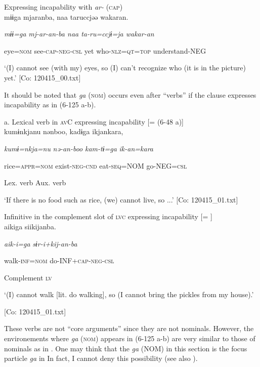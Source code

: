\ea\label{ex:6-124}
 Expressing incapability with \textit{ar-} (\textsc{cap})\\

{\TM}
\gll mɨɨga  mjaranba,  naa  taruccjəə  wakaran.

    \textit{mɨɨ=ga}  \textit{mj-ar-an{}-ba  naa  ta-ru=ccjɨ=ja  wakar-an}

    eye=\textsc{nom}  see-\textsc{cap}-\textsc{neg}-\textsc{csl}  yet  who-\textsc{nlz}=\textsc{qt}=\textsc{top}  understand-NEG

\glt    ‘(I) cannot see (with my) eyes, so (I) can’t recognize who (it is in the picture) yet.’ [Co: 120415\_00.txt]
\z

It should be noted that \textit{ga} (\textsc{nom}) occurs even after “verbs” if the clause expresses incapability as in (6-125 a-b).

\ea\label{ex:6-125}
 a. Lexical verb in \textsc{av}C expressing incapability [= (6-48 a)]\\

{\TM}
\gll kumɨnkjanu  nənboo,  kadɨga  ikjankara,

    \textit{kumɨ=nkja=nu}  \textit{nə-an-boo}  \textit{kam-tɨ=ga}  \textit{ik-an=kara}

    rice=\textsc{appr}=\textsc{nom}  exist-\textsc{neg}-\textsc{cnd}  eat-\textsc{seq}=NOM  go-NEG=\textsc{csl}

        Lex. verb  Aux. verb

\glt    ‘If there is no food such as rice, (we) cannot live, so ...’ [Co: 120415\_01.txt]
\z

\ex Infinitive in the complement slot of \textsc{lvc} expressing incapability [= ]\\

{\TM}
\gll aikiga  siikijanba.

    \textit{aik-i=ga}  \textit{sɨr-i+kij-an{}-ba}

    walk-\textsc{inf}=\textsc{nom}  do-INF+\textsc{cap}-\textsc{neg}-\textsc{csl}

    Complement  \textsc{lv}

\glt    ‘(I) cannot walk [lit. do walking], so (I cannot bring the pickles from my house).’

  [Co: 120415\_01.txt]
\z

These verbs are not “core arguments” since they are not nominals. However, the environements where \textit{ga} (\textsc{nom}) appears in (6-125 a-b) are very similar to those of nominals as in . One may think that the \textit{ga} (NOM) in this section is the focus particle \textit{ga} in  In fact, I cannot deny this possibility (see also ).


